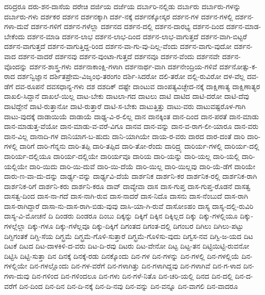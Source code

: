 {ದರಿದ್ರರೂ
ದರು-ಶನ-ದಾಸೆಯ
ದರೇಚಿ
ದರ್ಜಿಯ
ದರ್ಜೆಯ
ದರ್ಬಾರಿ-ನಲ್ಲಿಡು
ದರ್ಬಾರು
ದರ್ಬಾರು-ಗಳನ್ನು
ದರ್ಬಾರು-ಗಳು
ದರ್ಶಕರ
ದರ್ಶನ
ದರ್ಶನಕ್ಕಾಗಿ
ದರ್ಶ-ನಕ್ಕೆ
ದರ್ಶನಕ್ಕೋಸ್ಕರ
ದರ್ಶನ-ಗಳ
ದರ್ಶನ-ಗಳಲ್ಲಿ
ದರ್ಶನ-ಗಳಾ-ದುವೆ
ದರ್ಶನ-ಗಳಿಗೆ
ದರ್ಶನ-ಗಳೆಲ್ಲಾ
ದರ್ಶನದ
ದರ್ಶನ-ದಲ್ಲಿ
ದರ್ಶನ-ದಾರಭ್ಯ
ದರ್ಶನ-ದಿಂದ
ದರ್ಶನ-ಮಾಡ-ಬೇಕೆಂದು
ದರ್ಶನ-ಮಾಡಿ
ದರ್ಶನ-ಲಾಭ
ದರ್ಶನ-ಲಾಭ-ದಿಂದ
ದರ್ಶನ-ಲಾಭ-ವಾಗುತ್ತದೆ
ದರ್ಶನ-ವಾಗಿ-ಬಿಟ್ಟರೆ
ದರ್ಶನ-ವಾಗುತ್ತದೆ
ದರ್ಶನ-ವಾಗುತ್ತಿದ್ದ-ರಿಂದ
ದರ್ಶನ-ವಾ-ಗು-ವು-ದಿಲ್ಲ-ವೆಂದು
ದರ್ಶನ-ವಾಗು-ವುದೋ
ದರ್ಶನ-ವಾದ
ದರ್ಶನ-ವಾದರೆ
ದರ್ಶನವು
ದರ್ಶನ-ವುಂಟಾ-ಗುತ್ತದೆ
ದರ್ಶನವೂ
ದರ್ಶನ-ವೆಂದು
ದರ್ಶನವೇ
ದರ್ಶನ-ವೊಂದನ್ನು
ದರ್ಶನ-ಶಾಸ್ತ್ರ-ಗಳು
ದರ್ಶನಾಕಾಂಕ್ಷಿ-ಗಳಾಗಿ
ದರ್ಶನಾರ್ಥ-ವಾಗಿ
ದರ್ಶನೇಂದ್ರಿಯ-ಗಳಿವೆ
ದರ್ಶನೋತ್ಸು-ಕ-ರಾದ
ದರ್ಶನ್ವಿಜ್ಞಾನ
ದರ್ಶಿತಪ್ರೇಮ-ವಿಜೃಂಭಿ-ತರಂಗಂ
ದರ್ಶಿ-ಸಿದರೋ
ದಲಿ-ತರೋ
ದಲ್ಲಿ-ರುವಿರೋ
ದಳ-ವೆಲ್ಲ
ದವ-ಡೆಗೆ
ದವ-ರೂಪನೆ
ದವಸಧಾನ್ಯ-ಗಳು
ದಶ
ದಶದಿಕ್
ದಷ್ಟೇ
ದಾಂಟುವ
ದಾಂಪತ್ಯವಿಚ್ಛೇದ-ನಕ್ಕೆ
ದಾಕ್ಷಿಣಾತ್ಯ
ದಾಕ್ಷಿಣಾತ್ಯರ
ದಾಖಲಿ-ಸಿದ್ದಾನೆ
ದಾಖಲೆ-ಯಿಲ್ಲ
ದಾಟ-ಬೇಕು
ದಾಟಲಾ-ಗದ
ದಾಟಲು
ದಾಟಿ
ದಾಟಿದ
ದಾಟಿ-ದರೋ
ದಾಟಿ-ದೆವು
ದಾಟಿದ್ದೇನೆ
ದಾಟಿ-ರುತ್ತಾನೋ
ದಾಟಿ-ರುತ್ತಾರೆ
ದಾಟಿ-ಸ-ಬೇಕು
ದಾಟುತ್ತಿತ್ತು
ದಾಟು-ವರು
ದಾಟುವಷ್ಟರೊಳ-ಗಾಗಿ
ದಾಟು-ವುದಕ್ಕೆ
ದಾಡಾಯಿಯೆ
ದಾಡಾಯೆ
ದಾಢ್ಯ-ವಿ-ರ-ಲಿಲ್ಲ
ದಾನ
ದಾನಕ್ಕಿಂತ
ದಾನ-ದಿಂದ
ದಾನ-ಪರತೆ
ದಾನ-ಮಾಡು
ದಾನ-ಮಾಡುತ್ತ-ವೆಯೋ
ದಾನ-ಮಾಡು-ವ-ವರೆ-ವಿಗೂ
ದಾನವ
ದಾನ-ವನ್ನು
ದಾನ-ವ-ರಾಗ-ಲೀ-ಯಾರೂ
ದಾನ-ವರು
ದಾನ-ವಿಲ್ಲ
ದಾನಾದಿ-ಗಳ
ದಾನಿಯಾಗ-ಬ-ಹುದು
ದಾನಿ-ಯಾಗಿಯೇ
ದಾಯ-ರ-ವರು
ದಾರದ
ದಾರ-ದಂತೆ
ದಾರಿ
ದಾರಿ-ಗಳಲ್ಲಿ
ದಾರಿಗೆ
ದಾರಿ-ಗೆನ್ನನು
ದಾರಿ-ತಪ್ಪಿ
ದಾರಿ-ತಪ್ಪಿದ
ದಾರಿ-ತೋ-ರೆಂದು
ದಾರಿದ್ರ್ಯ
ದಾರಿರ್ಯ-ಗಳಲ್ಲಿ
ದಾರಿರ್ಯ-ದಲ್ಲಿ
ದಾರಿರ್ಯ-ದಲ್ಲಿಯೂ
ದಾರಿರ್ಯ-ದಲ್ಲಿಯೇ
ದಾರಿರ್ಯವೂ
ದಾರಿಯ
ದಾರಿ-ಯನ್ನು
ದಾರಿ-ಯಲ್ಲ
ದಾರಿ-ಯಲ್ಲಿ
ದಾರಿ-ಯಲ್ಲಿಯೇ
ದಾರಿ-ಯಿದು
ದಾರಿ-ಯಿ-ದುವೆ
ದಾರಿ-ಯಿ-ದೆಯೆ
ದಾರಿ-ಯಿಲ್ಲ
ದಾರಿ-ಯಿಲ್ಲವು
ದಾರಿ-ಯೆ-ಡೆಗೆ
ದಾರಿಯೇ
ದಾರು-ಣ-ವಾ-ದು-ದನ್ನು
ದಾರ್ಢ್ಯ-ವನ್ನು
ದಾರ್ಢ್ಯವಿ-ದೆಯೆ
ದಾರ್ಶನಿಕ
ದಾರ್ಶನಿ-ಕರ
ದಾರ್ಶನಿಕ-ರಲ್ಲಿ
ದಾರ್ಶನಿಕ-ರಾಗಿ
ದಾರ್ಶನಿಕ-ರಿಗೆ
ದಾರ್ಶನಿ-ಕರು
ದಾರ್ಶನಿ-ಕರೂ
ದಾವ್
ದಾವ್ಯೇವಾ
ದಾಸ
ದಾಸ-ಗುಪ್ತ
ದಾಸ-ಗುಪ್ತ-ರೊಡನೆ
ದಾಸತ್ವ
ದಾಸತ್ವ-ದಿಂದ
ದಾಸ-ನಾ-ಗದೆ
ದಾಸ-ನಾಗಿ-ರುವ
ದಾಸ-ನಾದರೆ
ದಾಸ-ನಿದೊ
ದಾಸನು
ದಾಸ-ನೆಂಬುದೆ
ದಾಸ-ರಾಗಿ
ದಾಸ-ರಾಗಿದ್ದಾರೆ
ದಾಸಾ-ನು-ದಾಸ-ರಾಗಿ-ಬಿಡು-ವುವು
ದಾಸಿ-ಯಾ-ಗಿ-ರುವೆ
ದಾಸೋಽಹಂ
ದಾಸ್ಯ
ದಾಸ್ಯ-ದಲ್ಲಿ-ರುವಿರಿ
ದಾಸ್ಯ-ವಿ-ಮೋಚನೆ
ದಿ
ದಿಂಡರು
ದಿಂಡರೂ
ದಿಂಬು
ದಿಕ್ಕನ್ನು
ದಿಕ್ಕಿಗೆ
ದಿಕ್ಕಿನ
ದಿಕ್ಕಿಲ್ಲದ
ದಿಕ್ಕು
ದಿಕ್ಕು-ಗಳಲ್ಲಿಯೂ
ದಿಕ್ಕು-ಗಳಲ್ಲೆಲ್ಲಾ
ದಿಕ್ಕು-ಗಳೂ
ದಿಕ್ಕು-ಗಳೆಲ್ಲವೂ
ದಿಕ್ಕು-ದಿಕ್ಕಿಗೆ
ದಿಗಂತದ
ದಿಗಂತ-ದಲ್ಲಿ
ದಿಗಂಬರ
ದಿಗಿಲು
ದಿಗಿಲು-ಪಟ್ಟು
ದಿಗ್ದಿಗಂತಕೆ
ದಿಗ್ದಿ-ಸೆಯ
ದಿಗ್ಭ್ರಮೆ
ದಿಗ್ಭ್ರಮೆ-ಗೊಳಿ-ಸುತ್ತಾರೆ
ದಿಗ್ಭ್ರಮೆ-ಗೊಳಿಸು-ವುದು
ದಿಗ್ವಸ-ನವ
ದಿಗ್ವಿ-ಜ-ಯದ
ದಿಟ
ದಿಟಕೆ
ದಿಟದ
ದಿಟ-ದಾಳಕಿಳಿ-ದ-ವರು
ದಿಟ-ದಿ-ರವು
ದಿಟರು
ದಿಟ-ವೇನೋ
ದಿಟ್ಟ
ದಿಟ್ಟ-ತನ
ದಿಟ್ಟಿಯಿಟ್ಟಿ-ರುವನೋ
ದಿಟ್ಟಿಸಿ
ದಿಟ್ಟಿ-ಸುತ್ತಾ
ದಿನ
ದಿನಕ್ಕೆ
ದಿನಕ್ಕೆ-ರಡು
ದಿನಕ್ಕೊಂದು
ದಿನ-ಗಳ
ದಿನ-ಗಳನ್ನು
ದಿನ-ಗಳಲ್ಲಿ
ದಿನ-ಗಳಲ್ಲಿಯೆ
ದಿನ-ಗಳಲ್ಲಿಯೇ
ದಿನ-ಗಳಲ್ಲೊಂದು
ದಿನ-ಗಳ-ವರೆಗೆ
ದಿನ-ಗಳಾಗಿತ್ತು
ದಿನ-ಗಳಾಗಿದ್ದವು
ದಿನ-ಗಳಾಗಿವೆ
ದಿನ-ಗ-ಳಾದ
ದಿನ-ಗಳಾ-ದುವು
ದಿನ-ಗಳಿಂದ
ದಿನ-ಗಳಿಂದಲೂ
ದಿನ-ಗಳು
ದಿನ-ಗಳೆ-ನಿತೊ
ದಿನ-ಚರಿ-ಯಲ್ಲಿ
ದಿನದ
ದಿನ-ದಲ್ಲಿ
ದಿನ-ದ-ವರೆಗೆ
ದಿನ-ದಿಂದ
ದಿನ-ದಿನ
ದಿನ-ದಿ-ನಕ್ಕೆ
ದಿನ-ದಿ-ನವು
ದಿನ-ವನ್ನು
ದಿನ-ವನ್ನೂ
ದಿನ-ವಾಗಲಿ
ದಿನ-ವಾದರೂ
}
